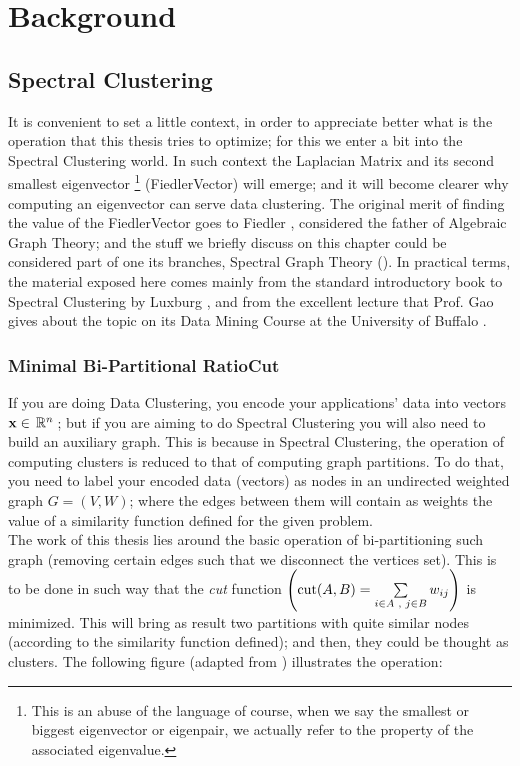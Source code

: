 \chapter{Background}
\label{cha:backg}

\section{Spectral Clustering}

It is convenient to set a little context, in order to appreciate
better what is the operation that this thesis tries to optimize; for
this we enter a bit into the Spectral Clustering world. In such
context the \gls{Laplacian} Matrix and its second smallest eigenvector
\footnote{This is an abuse of the language of course, when
we say the smallest or biggest eigenvector or eigenpair, we actually refer to
the property of the associated eigenvalue.}
(\gls{FiedlerVector}) will emerge; and it will become clearer why computing
an eigenvector can serve data clustering. The original merit of
finding the value of the \gls{FiedlerVector} goes to Fiedler
\cite{fiedler73}, considered the father of Algebraic Graph Theory; and
the stuff we briefly discuss on this chapter could be considered part
of one its branches, Spectral Graph Theory (\cite{brouwer12}). In
practical terms, the material exposed here comes mainly from the
standard introductory book to Spectral Clustering by Luxburg \cite{luxburg07},
and from the excellent lecture that Prof. Gao gives about the topic on
its Data Mining Course at the University of Buffalo \cite{gao13}.

\subsection{Minimal Bi-Partitional RatioCut}

If you are doing Data Clustering, you encode your applications' data
into vectors $\mathbf{x} \in \,\mathbb{R}^{n}\,$; but if you are aiming to do Spectral
Clustering you will also need to build an auxiliary graph. This is
because in Spectral Clustering, the operation of computing clusters is
reduced to that of computing graph partitions. To do that, you need to
label your encoded data (vectors) as nodes in an undirected weighted graph $G =
(V,W)$; where the edges between them will contain as weights the value 
of a similarity function defined for the given problem. \\

The work of this thesis lies around the basic operation of
bi-partitioning such graph (removing certain edges such that we
disconnect the vertices set). This is to be done in such way that the
\emph{cut} function $\left(\operatorname{cut}(A,B) = \sum\limits_{\tiny{i \in A
    \ensuremath{\,\,,\,\,} j \in B}} w_{ij}\right)$ is minimized. This will bring as result
two partitions with quite similar nodes (according to the similarity
function defined); and then, they could be thought as clusters. The
following figure (adapted from \cite{gao13}) illustrates the
operation:

